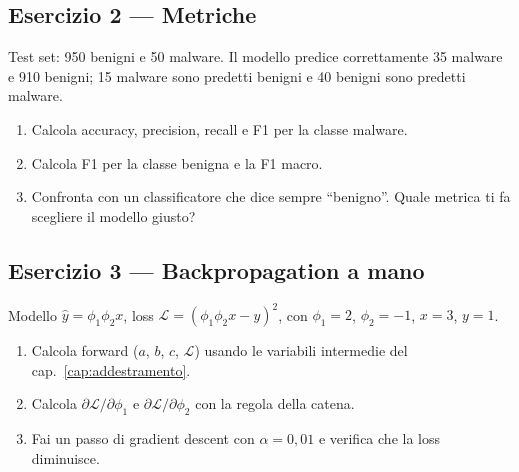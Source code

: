 \subsection*{Esercizio 2 --- Metriche}\label{es:e2}
Test set: 950 benigni e 50 malware. Il modello predice correttamente 35 malware e 910 benigni; 15 malware sono predetti benigni e 40
benigni sono predetti malware.
\begin{enumerate}[label=(\alph*)]
  \item Calcola accuracy, precision, recall e F1 per la classe malware.
  \item Calcola F1 per la classe benigna e la F1 macro.
  \item Confronta con un classificatore che dice sempre ``benigno''. Quale metrica ti fa scegliere il modello giusto?
\end{enumerate}

\subsection*{Esercizio 3 --- Backpropagation a mano}\label{es:e3}
Modello $\hat y = \phi_1\phi_2 x$, loss $\mathcal{L} = (\phi_1\phi_2x - y)^2$, con $\phi_1 = 2$, $\phi_2 = -1$, $x=3$, $y=1$.
\begin{enumerate}[label=(\alph*)]
  \item Calcola forward ($a$, $b$, $c$, $\mathcal{L}$) usando le variabili intermedie del cap.~\ref{cap:addestramento}.
  \item Calcola $\partial\mathcal{L}/\partial\phi_1$ e $\partial\mathcal{L}/\partial\phi_2$ con la regola della catena.
  \item Fai un passo di gradient descent con $\alpha = 0{,}01$ e verifica che la loss diminuisce.
\end{enumerate}

